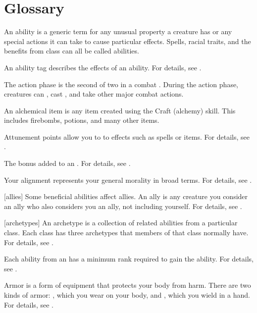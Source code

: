 \chapter{Glossary}\label{Glossary}

 An ability is a generic term for any unusual property a creature has or any special actions it can take to cause particular effects.
Spells, racial traits, and the benefits from class  can all be called abilities.

 An ability tag describes the effects of an ability.
For details, see .

 The action phase is the second of two  in a combat .
During the action phase, creatures can , cast , and take other major combat actions.

 An alchemical item is any item created using the Craft (alchemy) skill.
This includes firebombs, potions, and many other items.

 Attunement points allow you to  to effects such as spells or items.
For details, see .

 The bonus added to an .
For details, see .

 Your alignment represents your general morality in broad terms.
For details, see .

[allies] Some beneficial abilities affect allies.
An ally is any creature you consider an ally who also considers you an ally, not including yourself.
For details, see .

[archetypes] An archetype is a collection of related abilities from a particular class.
Each class has three archetypes that members of that class normally have.
For details, see .

 Each ability from an  has a minimum rank required to gain the ability.
For details, see .

 Armor is a form of equipment that protects your body from harm.
There are two kinds of armor: , which you wear on your body, and , which you wield in a hand.
For details, see .


